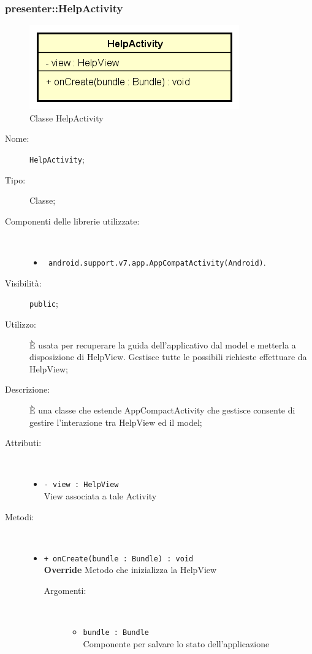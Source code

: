 \documentclass[../DefinizioneDiProdotto.tex]{subfiles}
\begin{document}
\subsubsection{presenter::HelpActivity}

    \begin{figure}[H]
        \centering
        \includegraphics{img/HelpActivity.png}
        \caption{Classe HelpActivity}\label{fig:presenter::HelpActivity} 
    \end{figure}
    \begin{description}
\item[Nome:] \texttt{HelpActivity};
\item[Tipo:] Classe;
\item[Componenti delle librerie utilizzate:] \
\begin{itemize}
\item \texttt{ android.support.v7.app.AppCompatActivity(Android)}.

\end{itemize}
\item[Visibilità:] \texttt{public};
\item[Utilizzo:] È usata per recuperare la guida dell'applicativo dal model e metterla a disposizione di HelpView. Gestisce tutte le possibili richieste effettuare da HelpView;
\item[Descrizione:] È una classe che estende AppCompactActivity che gestisce consente di gestire l'interazione tra HelpView ed il model;
\item[Attributi:] \
\begin{itemize}
\item \texttt{- view : HelpView}\\
View associata a tale Activity

\end{itemize}
\item[Metodi:] \
\begin{itemize}
\item \texttt{+ onCreate(bundle : Bundle) : void}\\
\textbf{Override} Metodo che inizializza la HelpView
 \begin{description}
\item[Argomenti:] \
\begin{itemize}
\item \texttt{bundle : Bundle}\\
Componente per salvare lo stato dell'applicazione\end{itemize}
\end{description}
\end{itemize}
\end{description}
\end{document}

